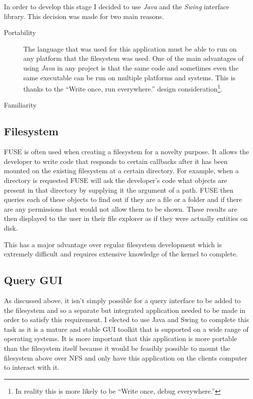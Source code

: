 In order to develop this stage I decided to use \emph{Java} and the
\emph{Swing} interface library. This decision was made for two main reasons.

\begin{description}
  \item[Portability] \hfill

    The language that was used for this application must be able to run on
    any platform that the filesystem was used. One of the main advantages
    of using \emph{Java} in any project is that the same code and
    sometimes even the same executable can be run on multiple platforms
    and systems. This is thanks to the ``Write once, run everywhere.''
    design consideration\footnote{In reality this is more likely to be
    ``Write once, debug everywhere.''}.

  \item[Familiarity] \hfill
\end{description}

\subsection{Filesystem}
\label{ssec:filesystem}

\ac{FUSE} is often used when creating a filesystem for a novelty purpose. It
allows the developer to write code that responds to certain callbacks after it
has been mounted on the existing filesystem at a certain directory. For
example, when a directory is requested \ac{FUSE} will ask the developer's code
what objects are present in that directory by supplying it the argument of
a path. \ac{FUSE} then queries each of these objects to find out if they are
a file or a folder and if there are any permissions that would not allow them
to be shown. These results are then displayed to the user in their file
explorer as if they were actually entities on disk.

This has a major advantage over regular filesystem development which is
extremely difficult and requires extensive knowledge of the kernel to complete.

\subsection{Query GUI}

As discussed above, it isn't simply possible for a query interface to be added
to the filesystem and so a separate but integrated application needed to be
made in order to satisfy this requirement. I elected to use Java and Swing to
complete this task as it is a mature and stable \ac{GUI} toolkit that is
supported on a wide range of operating systems. It is more important that this
application is more portable than the filesystem itself because it would be
feasibly possible to mount the filesystem above over \ac{NFS} and only have
this application on the clients computer to interact with it.

